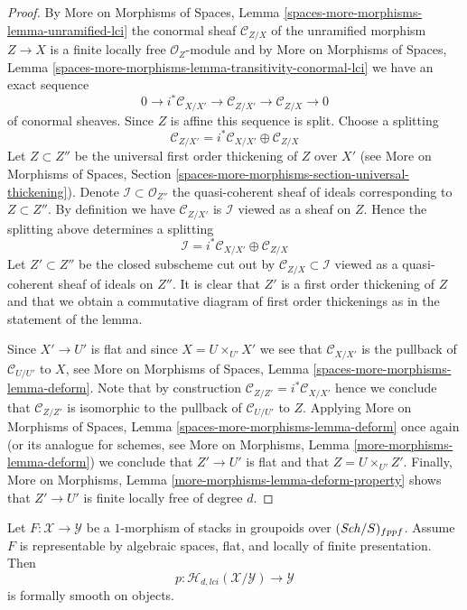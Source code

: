 \begin{proof}
By
More on Morphisms of Spaces,
Lemma \ref{spaces-more-morphisms-lemma-unramified-lci}
the conormal sheaf $\mathcal{C}_{Z/X}$ of the unramified morphism $Z \to X$
is a finite locally free $\mathcal{O}_Z$-module and by
More on Morphisms of Spaces,
Lemma \ref{spaces-more-morphisms-lemma-transitivity-conormal-lci}
we have an exact sequence
$$
0 \to i^*\mathcal{C}_{X/X'} \to
\mathcal{C}_{Z/X'} \to
\mathcal{C}_{Z/X} \to 0
$$
of conormal sheaves. Since $Z$ is affine this sequence is split. Choose
a splitting
$$
\mathcal{C}_{Z/X'} = i^*\mathcal{C}_{X/X'} \oplus \mathcal{C}_{Z/X}
$$
Let $Z \subset Z''$ be the universal first order thickening of $Z$
over $X'$ (see
More on Morphisms of Spaces,
Section \ref{spaces-more-morphisms-section-universal-thickening}).
Denote $\mathcal{I} \subset \mathcal{O}_{Z''}$ the quasi-coherent sheaf
of ideals corresponding to $Z \subset Z''$. By definition we have
$\mathcal{C}_{Z/X'}$ is $\mathcal{I}$ viewed as a sheaf on $Z$.
Hence the splitting above determines a splitting
$$
\mathcal{I} = i^*\mathcal{C}_{X/X'} \oplus \mathcal{C}_{Z/X}
$$
Let $Z' \subset Z''$ be the closed subscheme cut out by
$\mathcal{C}_{Z/X} \subset \mathcal{I}$ viewed as a quasi-coherent sheaf
of ideals on $Z''$. It is clear that $Z'$ is a first order thickening
of $Z$ and that we obtain a commutative diagram of first order thickenings
as in the statement of the lemma.

\medskip\noindent
Since $X' \to U'$ is flat and since $X = U \times_{U'} X'$ we see that
$\mathcal{C}_{X/X'}$ is the pullback of $\mathcal{C}_{U/U'}$ to $X$, see
More on Morphisms of Spaces, Lemma \ref{spaces-more-morphisms-lemma-deform}.
Note that by construction $\mathcal{C}_{Z/Z'} = i^*\mathcal{C}_{X/X'}$
hence we conclude that $\mathcal{C}_{Z/Z'}$ is isomorphic to the pullback
of $\mathcal{C}_{U/U'}$ to $Z$. Applying
More on Morphisms of Spaces, Lemma \ref{spaces-more-morphisms-lemma-deform}
once again (or its analogue for schemes, see
More on Morphisms, Lemma \ref{more-morphisms-lemma-deform})
we conclude that $Z' \to U'$ is flat and that $Z = U \times_{U'} Z'$.
Finally,
More on Morphisms, Lemma \ref{more-morphisms-lemma-deform-property}
shows that $Z' \to U'$ is finite locally free of degree $d$.
\end{proof}

\begin{lemma}
\label{lemma-lci-formally-smooth}
Let $F : \mathcal{X} \to \mathcal{Y}$ be a $1$-morphism of stacks in groupoids
over $(\mathit{Sch}/S)_{fppf}$. Assume $F$ is representable by algebraic
spaces, flat, and locally of finite presentation. Then
$$
p : \mathcal{H}_{d, lci}(\mathcal{X}/\mathcal{Y}) \to \mathcal{Y}
$$
is formally smooth on objects.
\end{lemma}

